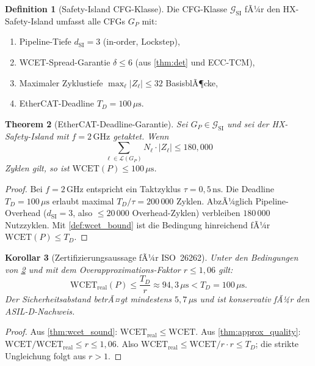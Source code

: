 ﻿\documentclass[a4paper,12pt]{article}
\theoremstyle{plain}
\newtheorem{theorem}{Theorem}[section]
\newtheorem{corollary}[theorem]{Korollar}
\theoremstyle{definition}
\newtheorem{definition}[theorem]{Definition}
\theoremstyle{remark}
\begin{document}
\begin{definition}[Safety-Island CFG-Klasse]\label{def:si_cfg}
Die CFG-Klasse $\mathcal{G}_\mathrm{SI}$ fÃ¼r den HX-Safety-Island
umfasst alle CFGs $G_P$ mit:
\begin{enumerate}[label=(\roman*)]
  \item Pipeline-Tiefe $d_\mathrm{SI} = 3$ (in-order, Lockstep),
  \item WCET-Spread-Garantie $\delta \leq 6$
        (aus \cref{thm:det} und ECC-TCM),
  \item Maximaler Zyklustiefe $\max_\ell |Z_\ell| \leq 32$ BasisblÃ¶cke,
  \item EtherCAT-Deadline $T_D = 100\,\mu\text{s}$.
\end{enumerate}
\end{definition}

\begin{theorem}[EtherCAT-Deadline-Garantie]\label{thm:ethercat}
Sei $G_P \in \mathcal{G}_\mathrm{SI}$ und sei der HX-Safety-Island
mit $f = 2\,\mathrm{GHz}$ getaktet. Wenn
\[
  \sum_{\ell \in \mathcal{L}(G_P)} N_\ell \cdot |Z_\ell| \leq 180{,}000
\]
Zyklen gilt, so ist $\mathrm{WCET}(P) \leq 100\,\mu\text{s}$.
\end{theorem}
\begin{proof}
Bei $f = 2\,\mathrm{GHz}$ entspricht ein Taktzyklus
$\tau = 0{,}5\,\mathrm{ns}$. Die Deadline $T_D = 100\,\mu\text{s}$
erlaubt maximal $T_D / \tau = 200\,000$ Zyklen.
AbzÃ¼glich Pipeline-Overhead ($d_\mathrm{SI} = 3$, also $\leq 20\,000$
Overhead-Zyklen) verbleiben $180\,000$ Nutzzyklen.
Mit \cref{def:wcet_bound} ist die Bedingung hinreichend fÃ¼r
$\mathrm{WCET}(P) \leq T_D$.
\end{proof}

\begin{corollary}[Zertifizierungsaussage fÃ¼r ISO~26262]\label{cor:iso_cert}
Unter den Bedingungen von \cref{thm:ethercat} und mit dem
Overapproximations-Faktor $r \leq 1{,}06$ gilt:
\[
  \mathrm{WCET}_\mathrm{real}(P) \leq \frac{T_D}{r} \approx 94{,}3\,\mu\text{s}
  < T_D = 100\,\mu\text{s}.
\]
Der Sicherheitsabstand betrÃ¤gt mindestens $5{,}7\,\mu\text{s}$
und ist konservativ fÃ¼r den ASIL-D-Nachweis.
\end{corollary}
\begin{proof}
Aus \cref{thm:wcet_sound}: $\mathrm{WCET}_\mathrm{real} \leq \mathrm{WCET}$.
Aus \cref{thm:approx_quality}: $\mathrm{WCET} / \mathrm{WCET}_\mathrm{real} \leq r \leq 1{,}06$.
Also $\mathrm{WCET}_\mathrm{real} \leq \mathrm{WCET} / r \cdot r \leq T_D$;
die strikte Ungleichung folgt aus $r > 1$.
\end{proof}
\end{document}
